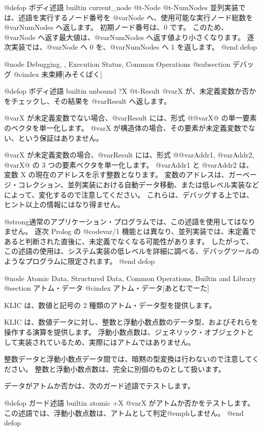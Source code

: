 {@defop {ボディ述語} {builtin} current_node @t{-}Node @t{-}NumNodes
並列実装では、述語を実行するノード番号を @var{Node} へ、使用可能な実行ノード総数を @var{NumNodes} へ返します。
初期ノード番号は、0 です。
このため、@var{Node} へ返す最大値は、@var{NumNodes} へ返す値より小さくなります。
逐次実装では、@var{Node} へ 0 を、@var{NumNodes} へ 1 を返します。
@end defop

@node Debugging,  , Execution Status, Common Operations
@subsection デバッグ
@cindex 未束縛[みそくばく]

@defop {ボディ述語} {builtin} unbound ?X @t{-}Result
 @var{X} が、未定義変数か否かをチェックし、その結果を @var{Result} へ返します。

@var{X} が未定義変数でない場合、@var{Result} には、形式 @{@var{X}@} の単一要素のベクタを単一化します。
 @var{X} が構造体の場合、その要素が未定義変数でない、という保証はありません。

@var{X} が未定義変数の場合、@var{Result} には、形式 @{@var{Addr1}, @var{Addr2}, @var{X}@} の 3 つの要素ベクタを単一化します。
@var{Addr1} と @var{Addr2} は、変数 X の現在のアドレスを示す整数となります。
変数のアドレスは、ガーベージ・コレクション、並列実装における自動データ移動、または低レベル実装などによって、変化するので注意してください。
これらは、デバッグする上では、ヒント以上の情報にはなり得ません。

@strong{通常のアプリケーション・プログラムでは、この述語を使用してはなりません。}  
逐次 Prolog の @code{var/1} 機能とは異なり、並列実装では、未定義であると判断された直後に、未定義でなくなる可能性があります。
したがって、この述語の使用は、システム実装の低レベルを詳細に調べる、デバッグツールのようなプログラムに限定されます。
@end defop


@node Atomic Data, Structured Data, Common Operations, Builtin and Library
@section アトム・データ
@cindex アトム・データ[あとむでーた]

KLIC は、数値と記号の 2 種類のアトム・データ型を提供します。

KLIC は、数値データに対し、整数と浮動小数点数のデータ型、およびそれらを操作する演算を提供します。
浮動小数点数は、ジェネリック・オブジェクトとして実装されているため、実際にはアトムではありません。

整数データと浮動小数点データ間では、暗黙の型変換は行わないので注意してください。
整数と浮動小数点数は、完全に別個のものとして扱います。

データがアトムか否かは、次のガード述語でテストします。

@defop {ガード述語} {builtin} atomic +X
 @var{X} がアトムか否かをテストします。
この述語では、浮動小数点数は、アトムとして判定@emph{しません}。
@end defop

}
